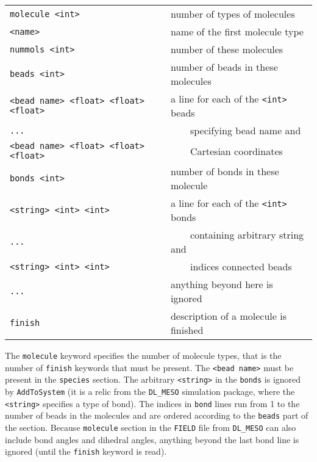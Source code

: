 \noindent
\begin{longtable}{ll}
  \texttt{molecule <int>} & number of types of molecules \\
  \texttt{<name>} & name of the first molecule type \\
  \texttt{nummols <int>} & number of these molecules \\
  \texttt{beads <int>} & number of beads in these molecules \\
  \texttt{<bead name> <float> <float> <float>} & a line for each of the \texttt{<int>} beads \\
  \texttt{...} & \ \ \ \ specifying bead name and \\
  \texttt{<bead name> <float> <float> <float>} & \ \ \ \ Cartesian coordinates \\
  \texttt{bonds <int>} & number of bonds in these molecule \\
  \texttt{<string> <int> <int>} & a line for each of the \texttt{<int>} bonds \\
  \texttt{...} & \ \ \ \ containing arbitrary string and \\
  \texttt{<string> <int> <int>} & \ \ \ \ indices connected beads \\
  \texttt{...} & anything beyond here is ignored \\
  \texttt{finish} & description of a molecule is finished \\
\end{longtable}

The \texttt{molecule} keyword specifies the number of molecule types, that
is the number of \texttt{finish} keywords that must be present. The
\texttt{<bead name>} must be present in the \texttt{species} section. The
arbitrary \texttt{<string>} in the \texttt{bonds} is ignored by
\texttt{AddToSystem} (it is a relic from the \texttt{DL\_MESO} simulation
package, where the \texttt{<string>} specifies a type of bond). The indices
in \texttt{bond} lines run from 1 to the number of beads in the molecules and are
ordered according to the \texttt{beads} part of the section. Because
\texttt{molecule} section in the \texttt{FIELD} file from \texttt{DL\_MESO}
can also include bond angles and dihedral angles, anything beyond the last
bond line is ignored (until the \texttt{finish} keyword is read).

